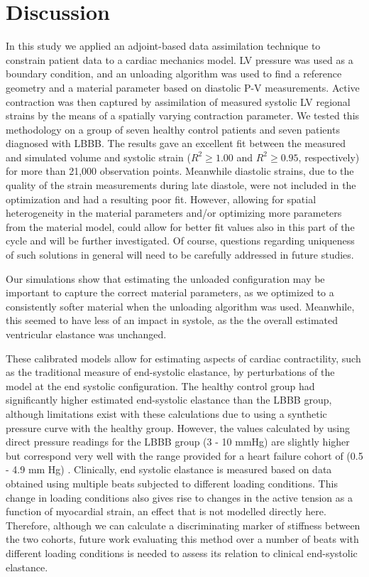 \section{Discussion}
In this study we applied an adjoint-based data assimilation technique
to constrain patient data to a cardiac mechanics model.
LV pressure was used as a boundary condition,  and an unloading algorithm was used to 
find a reference geometry and a material parameter based on diastolic P-V measurements.  
Active contraction was then captured by assimilation of measured systolic LV
regional strains by the means of a
spatially varying contraction parameter.  We tested this methodology on a group of
seven healthy control patients and seven patients
diagnosed with LBBB. The results gave an excellent fit between the measured
and simulated volume and systolic strain ($R^2 \geq 1.00$ and $R^2
\geq 0.95$, respectively) for more than 21,000 observation points.
Meanwhile diastolic strains, due to the quality of the strain measurements during late
diastole, were not included in the optimization and had a
resulting poor fit.  However, allowing for spatial heterogeneity in the 
material parameters and/or optimizing more parameters from the
material model, could allow for better fit values also in this
part of the cycle and will be further investigated. Of course, questions regarding uniqueness of
such solutions in general will need to be carefully
addressed in future studies. 

Our simulations show that estimating the unloaded configuration may be important to capture the
correct material parameters, as we optimized to a consistently softer material when the unloading 
algorithm was used.  Meanwhile, this seemed to have less of an impact in systole, as the 
the overall estimated ventricular elastance was unchanged.

These calibrated models allow for estimating aspects of cardiac
contractility, such as the traditional measure of end-systolic
elastance, by perturbations of the model at the end systolic
configuration.  The healthy control group had significantly higher estimated
end-systolic elastance than the LBBB group, although limitations exist
with these calculations due to using a synthetic pressure curve with
the healthy group.  However, the values calculated by using direct
pressure readings for the LBBB group (3 - 10 mmHg) are slightly higher
but correspond very well with the range provided for a heart failure
cohort of (0.5 - 4.9 mm Hg) \cite{senzaki1996single}. Clinically, end systolic elastance is measured
based on data obtained using multiple beats
subjected to different loading conditions. This change in loading
conditions  also gives rise to changes in the active tension as a function of myocardial strain,
an effect that is not modelled directly here.  Therefore, although we can calculate a discriminating marker of
stiffness between the two cohorts, future work evaluating this method over a number of beats
with different loading conditions is needed to assess its relation to clinical end-systolic elastance.

